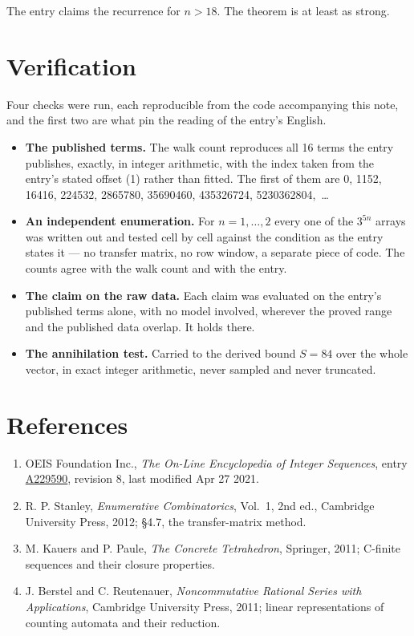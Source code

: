 \documentclass[11pt]{article}
\theoremstyle{definition}
\begin{document}
The entry claims the recurrence for $n > 18$. The theorem is at least as strong.

\section{Verification}

Four checks were run, each reproducible from the code accompanying this note, and the first two are what pin the reading of the entry's English.

\begin{itemize}

\item {\bfseries The published terms.} The walk count reproduces all 16 terms the entry publishes, exactly, in integer arithmetic, with the index taken from the entry's stated offset (1) rather than fitted. The first of them are 0, 1152, 16416, 224532, 2865780, 35690460, 435326724, 5230362804,~\dots

\item {\bfseries An independent enumeration.} For $n = 1,\dots,2$ every one of the $3^{5n}$ arrays was written out and tested cell by cell against the condition as the entry states it --- no transfer matrix, no row window, a separate piece of code. The counts agree with the walk count and with the entry.

\item {\bfseries The claim on the raw data.} Each claim was evaluated on the entry's published terms alone, with no model involved, wherever the proved range and the published data overlap. It holds there.

\item {\bfseries The annihilation test.} Carried to the derived bound $S = 84$ over the whole vector, in exact integer arithmetic, never sampled and never truncated.

\end{itemize}

\section{References}

\begin{enumerate}

\item OEIS Foundation Inc., \emph{The On-Line Encyclopedia of Integer Sequences}, entry \href{https://oeis.org/A229590}{A229590}, revision 8, last modified Apr 27 2021.

\item R. P. Stanley, \emph{Enumerative Combinatorics}, Vol.~1, 2nd ed., Cambridge University Press, 2012; \S4.7, the transfer-matrix method.

\item M. Kauers and P. Paule, \emph{The Concrete Tetrahedron}, Springer, 2011; C-finite sequences and their closure properties.

\item J. Berstel and C. Reutenauer, \emph{Noncommutative Rational Series with Applications}, Cambridge University Press, 2011; linear representations of counting automata and their reduction.

\end{enumerate}
\end{document}
